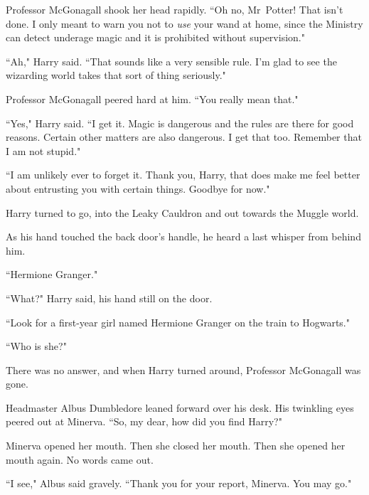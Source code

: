 Professor McGonagall shook her head rapidly. ``Oh no, Mr~Potter! That isn't done. I only meant to warn you not to \emph{use} your wand at home, since the Ministry can detect underage magic and it is prohibited without supervision."

``Ah," Harry said. ``That sounds like a very sensible rule. I'm glad to see the wizarding world takes that sort of thing seriously."

Professor McGonagall peered hard at him. ``You really mean that."

``Yes," Harry said. ``I get it. Magic is dangerous and the rules are there for good reasons. Certain other matters are also dangerous. I get that too. Remember that I am not stupid."

``I am unlikely ever to forget it. Thank you, Harry, that does make me feel better about entrusting you with certain things. Goodbye for now."

Harry turned to go, into the Leaky Cauldron and out towards the Muggle world.

As his hand touched the back door's handle, he heard a last whisper from behind him.

``Hermione Granger."

``What?" Harry said, his hand still on the door.

``Look for a first-year girl named Hermione Granger on the train to Hogwarts."

``Who is she?"

There was no answer, and when Harry turned around, Professor McGonagall was gone.


Headmaster Albus Dumbledore leaned forward over his desk. His twinkling eyes peered out at Minerva. ``So, my dear, how did you find Harry?"

Minerva opened her mouth. Then she closed her mouth. Then she opened her mouth again. No words came out.

``I see," Albus said gravely. ``Thank you for your report, Minerva. You may go."

